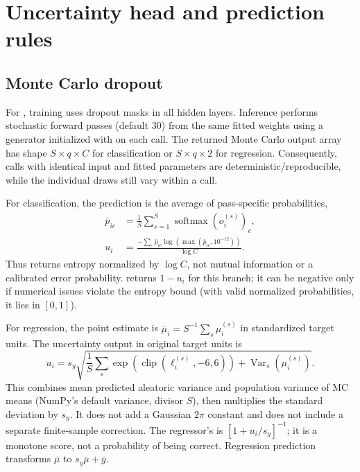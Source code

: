 \documentclass[conference]{IEEEtran}
\begin{document}
\section{Uncertainty head and prediction rules}
\subsection{Monte Carlo dropout}
For , training uses dropout masks in all hidden layers. Inference performs  stochastic forward passes (default 30) from the same fitted weights using a generator initialized with  on each call. The returned Monte Carlo output array has shape $S\times q\times C$ for classification or $S\times q\times2$ for regression. Consequently, calls with identical input and fitted parameters are deterministic/reproducible, while the individual draws still vary within a call.

For classification, the prediction is the average of pass-specific probabilities,
\begin{align}
 \bar p_{ic}&=\frac1S\sum_{s=1}^S\operatorname{softmax}(o_i^{(s)})_c,\\
 u_i&=\frac{-\sum_c\bar p_{ic}\log(\max(\bar p_{ic},10^{-12}))}{\log C}.
 \label{eq:classmc}
\end{align}
Thus  returns entropy normalized by $\log C$, not mutual information or a calibrated error probability.  returns $1-u_i$ for this branch; it can be negative only if numerical issues violate the entropy bound (with valid normalized probabilities, it lies in $[0,1]$).

For regression, the point estimate is $\bar\mu_i=S^{-1}\sum_s\mu_i^{(s)}$ in standardized target units. The uncertainty output in original target units is
\begin{equation}
 u_i=s_y\sqrt{\frac1S\sum_s\exp(\operatorname{clip}(\ell_i^{(s)},-6,6)) + \operatorname{Var}_s(\mu_i^{(s)})}.
 \label{eq:regmc}
\end{equation}
This combines mean predicted aleatoric variance and population variance of MC means (NumPy's default variance, divisor $S$), then multiplies the standard deviation by $s_y$. It does not add a Gaussian $2\pi$ constant and does not include a separate finite-sample correction. The regressor's  is $[1+u_i/s_y]^{-1}$; it is a monotone score, not a probability of being correct. Regression prediction transforms $\bar\mu$ to $s_y\bar\mu+\bar y$.
\end{document}
